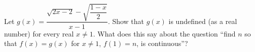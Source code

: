 Let $g(x)=\dfrac{\sqrt{2x-2}-\sqrt{\dfrac{1-x}{2}}}{x-1}$. Show that $g(x)$ is undefined (as a real number) for every real $x\ne1$. What does this say about the question ``find $n$ so that $f(x)=g(x)$ for $x\ne1$, $f(1)=n$, is continuous''?

